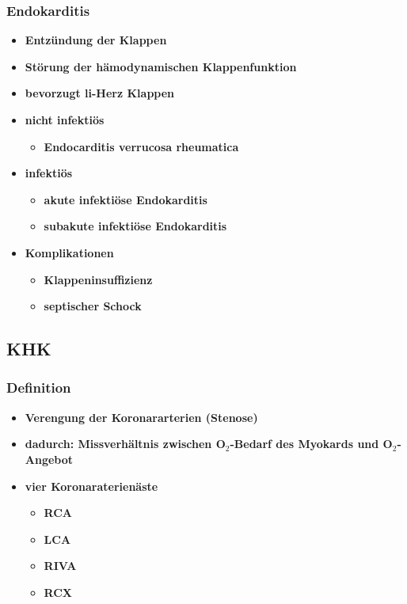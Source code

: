 		\subsubsection*{Endokarditis}
			\begin{itemize}
				\item \textbf{Entzündung der Klappen}
				\item \textbf{Störung der hämodynamischen Klappenfunktion}
				\item \textbf{bevorzugt li-Herz Klappen}
				\item \textbf{nicht infektiös}
					\begin{itemize}
						\item \textbf{Endocarditis verrucosa rheumatica}
					\end{itemize}
				\item \textbf{infektiös}
					\begin{itemize}
						\item \textbf{akute infektiöse Endokarditis}
						\item \textbf{subakute infektiöse Endokarditis}
					\end{itemize}
				\item \textbf{Komplikationen}
					\begin{itemize}
						\item \textbf{Klappeninsuffizienz}
						\item \textbf{septischer Schock}
					\end{itemize}
			\end{itemize}
	\subsection*{KHK}
		\subsubsection*{Definition}
			\begin{itemize}
				\item \textbf{Verengung der Koronararterien (Stenose)}
				\item \textbf{dadurch: Missverhältnis zwischen O$_2$-Bedarf des Myokards und O$_2$-Angebot}
				\item \textbf{vier Koronaraterienäste}
					\begin{itemize}
						\item \textbf{RCA}
						\item \textbf{LCA}
						\item \textbf{RIVA}
						\item \textbf{RCX}
					\end{itemize}
			\end{itemize}

